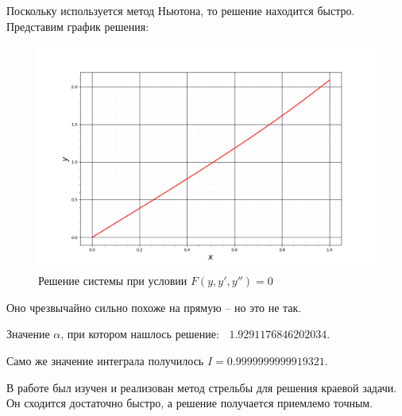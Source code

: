 		Поскольку используется метод Ньютона, то решение находится быстро. Представим график решения:

		\begin{figure}[h!]
			\centering
			\includegraphics[width=0.95\linewidth]{Pictures/Plot.png}
			\caption{Решение системы при условии $F(y, y', y'') = 0$}
		\end{figure}
	
		Оно чрезвычайно сильно похоже на прямую -- но это не так.
		
		Значение $\alpha$, при котором нашлось решение: $\;\; 1.9291176846202034$. 
		
		Само же значение интеграла получилось $     I = 0.9999999999919321$.
	
	
	
	
		
		В работе был изучен и реализован метод стрельбы для решения краевой задачи. Он сходится достаточно быстро, а решение получается приемлемо точным.
		
		
